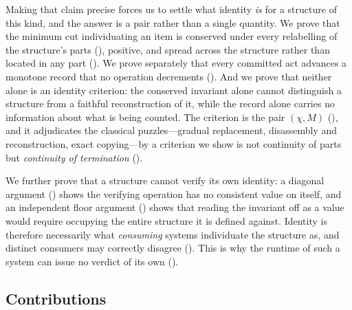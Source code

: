 \documentclass[11pt,twocolumn,a4paper]{article}
\theoremstyle{dirthm}
\theoremstyle{definition}
\theoremstyle{remark}
\newcommand{\rec}{M}
\newcommand{\Char}{\chi}
\begin{document}
Making that claim precise forces us to settle what identity \emph{is} for a
structure of this kind, and the answer is a pair rather than a single
quantity. We prove that the minimum cut individuating an item is conserved
under every relabelling of the structure's parts (),
positive, and spread across the structure rather than located in any part
(). We prove separately that every committed act advances
a monotone record that no operation decrements (). And we
prove that neither alone is an identity criterion: the conserved invariant
alone cannot distinguish a structure from a faithful reconstruction of it,
while the record alone carries no information about what is being counted.
The criterion is the pair $(\Char,\rec)$ (),
and it adjudicates the classical puzzles---gradual replacement, disassembly
and reconstruction, exact copying---by a criterion we show is not continuity
of parts but \emph{continuity of termination} ().

We further prove that a structure cannot verify its own identity: a
diagonal argument () shows the verifying operation
has no consistent value on itself, and an independent floor argument
() shows that reading the invariant off as a value
would require occupying the entire structure it is defined against. Identity
is therefore necessarily what \emph{consuming} systems individuate the
structure as, and distinct consumers may correctly disagree
(). This is why the runtime of such a system can issue no
verdict of its own ().

\subsection{Contributions}
\end{document}
